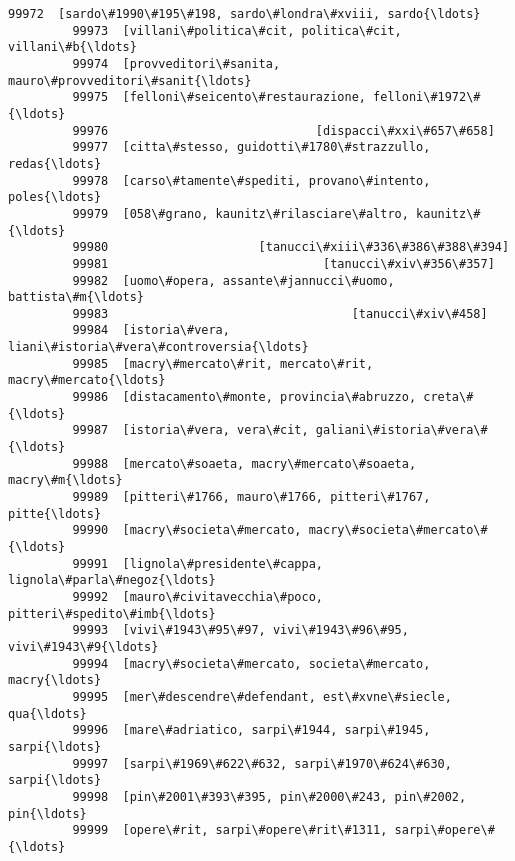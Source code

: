 \documentclass[11pt]{article}
\begin{document}
\begin{Verbatim}[commandchars=\\\{\}]
         99972  [sardo\#1990\#195\#198, sardo\#londra\#xviii, sardo{\ldots}   
         99973  [villani\#politica\#cit, politica\#cit, villani\#b{\ldots}   
         99974  [provveditori\#sanita, mauro\#provveditori\#sanit{\ldots}   
         99975  [felloni\#seicento\#restaurazione, felloni\#1972\#{\ldots}   
         99976                             [dispacci\#xxi\#657\#658]   
         99977  [citta\#stesso, guidotti\#1780\#strazzullo, redas{\ldots}   
         99978  [carso\#tamente\#spediti, provano\#intento, poles{\ldots}   
         99979  [058\#grano, kaunitz\#rilasciare\#altro, kaunitz\#{\ldots}   
         99980                     [tanucci\#xiii\#336\#386\#388\#394]   
         99981                              [tanucci\#xiv\#356\#357]   
         99982  [uomo\#opera, assante\#jannucci\#uomo, battista\#m{\ldots}   
         99983                                  [tanucci\#xiv\#458]   
         99984  [istoria\#vera, liani\#istoria\#vera\#controversia{\ldots}   
         99985  [macry\#mercato\#rit, mercato\#rit, macry\#mercato{\ldots}   
         99986  [distacamento\#monte, provincia\#abruzzo, creta\#{\ldots}   
         99987  [istoria\#vera, vera\#cit, galiani\#istoria\#vera\#{\ldots}   
         99988  [mercato\#soaeta, macry\#mercato\#soaeta, macry\#m{\ldots}   
         99989  [pitteri\#1766, mauro\#1766, pitteri\#1767, pitte{\ldots}   
         99990  [macry\#societa\#mercato, macry\#societa\#mercato\#{\ldots}   
         99991  [lignola\#presidente\#cappa, lignola\#parla\#negoz{\ldots}   
         99992  [mauro\#civitavecchia\#poco, pitteri\#spedito\#imb{\ldots}   
         99993  [vivi\#1943\#95\#97, vivi\#1943\#96\#95, vivi\#1943\#9{\ldots}   
         99994  [macry\#societa\#mercato, societa\#mercato, macry{\ldots}   
         99995  [mer\#descendre\#defendant, est\#xvne\#siecle, qua{\ldots}   
         99996  [mare\#adriatico, sarpi\#1944, sarpi\#1945, sarpi{\ldots}   
         99997  [sarpi\#1969\#622\#632, sarpi\#1970\#624\#630, sarpi{\ldots}   
         99998  [pin\#2001\#393\#395, pin\#2000\#243, pin\#2002, pin{\ldots}   
         99999  [opere\#rit, sarpi\#opere\#rit\#1311, sarpi\#opere\#{\ldots}   
         

\end{Verbatim}
\end{document}

